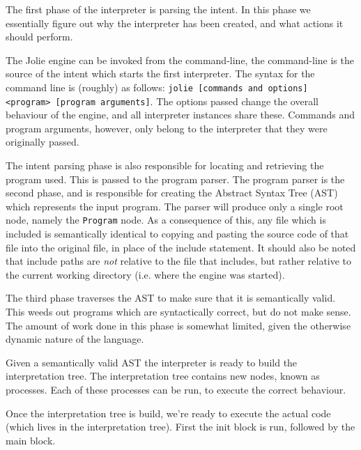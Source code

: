 The first phase of the interpreter is parsing the intent. In this phase we
essentially figure out why the interpreter has been created, and what actions
it should perform.

The Jolie engine can be invoked from the command-line, the command-line is the
source of the intent which starts the first interpreter. The syntax for the
command line is (roughly) as follows: \texttt{jolie [commands and
options] <program> [program arguments]}. The options passed change the
overall behaviour of the engine, and all interpreter instances share these.
Commands and program arguments, however, only belong to the interpreter that
they were originally passed.

The intent parsing phase is also responsible for locating and retrieving the
program used. This is passed to the program parser. The program parser is the
second phase, and is responsible for creating the Abstract Syntax Tree (AST)
which represents the input program. The parser will produce only a single root
node, namely the \verb!Program! node. As a consequence of this, any file which
is included is semantically identical to copying and pasting the source code of
that file into the original file, in place of the include statement. It should
also be noted that include paths are \emph{not} relative to the file that
includes, but rather relative to the current working directory (i.e. where the
engine was started).

The third phase traverses the AST to make sure that it is semantically valid.
This weeds out programs which are syntactically correct, but do not make sense.
The amount of work done in this phase is somewhat limited, given the otherwise
dynamic nature of the language.

Given a semantically valid AST the interpreter is ready to build the
interpretation tree. The interpretation tree contains new nodes, known as
processes. Each of these processes can be run, to execute the correct
behaviour.

Once the interpretation tree is build, we're ready to execute the actual code
(which lives in the interpretation tree). First the init block is run, followed
by the main block.
